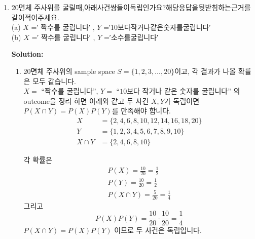 \documentclass{article}
\newenvironment{solution}
{
    \par\medskip
    \noindent\textbf{Solution:}
    \begin{adjustwidth}{1em}{0em}
}
{
    \end{adjustwidth}
    \medskip
}
\begin{document}
\begin{enumerate}[label=\textbf{\arabic*.}, leftmargin=*]
\begin{solution}
\begin{enumerate}[label=(\alph*), leftmargin=2em, itemsep=1em]
        분자 $P(S_1\cap F_2)$는 전체확률법칙을 이용해서 구합니다.  
        $$  
        P(S_1\cap F_2)=P(S_1\cap F_2\mid H+)P(H+)+P(S_1\cap F_2\mid H-)P(H-)  
        $$  
        $H+$ 참가자는 항상 잔류하므로 두 번째 에피소드에서 탈락할 확률이 $0$이고, $H-$ 참가자는 첫 번째 에피소드에서 잔류할 확률이 1/3, 두 번째 에피소드에서 탈락할 확률이 2/3이기 때문에 값을 넣어 계산하면:  
        \begin{align*}
            P(S_1\cap F_2)
            &=0\cdot\frac14+\left(\frac13\cdot\frac23\right)\cdot\frac34\\
            &=\frac13\cdot\frac23\cdot\frac34=\frac16  
        \end{align*}
        따라서  
        $$  
        P(F_2\mid S_1)=\frac{\frac16}{\frac12}=\frac13  
        $$  
        따라서 첫 번째 에피소드에서 잔류에 성공한 참가자가 두 번째 에피소드에서 탈락할 확률은 $\frac13$ 입니다.
        
        \end{enumerate}
    
    \end{solution}
\newpage

\item 20면체 주사위를 굴릴때,아래사건쌍들이독립인가요?해당응답을뒷받침하는근거를같이적어주세요.\\
(a) $X$ =′ 짝수를 굴립니다′ , $Y$ =′10보다작거나같은숫자를굴립니다′\\
(b) $X$ =′ 짝수를 굴립니다′ , $Y$ =′소수를굴립니다′

    \begin{solution}
        \begin{enumerate}[label=(\alph*), leftmargin=2em, itemsep=1em]
            
            \item20면체 주사위의 sample space $S=\{1,2,3,\dots,20\}$이고, 각 결과가 나올 확률은 모두 같습니다.  \\
            $X=$ “짝수를 굴립니다”, $Y=$ “$10$보다 작거나 같은 숫자를 굴립니다” 의 outcome을 정리 하면 아래와 같고 두 사건 $X,Y$가 독립이면$P(X\cap Y)=P(X)P(Y)$를 만족해야 합니다.
            \begin{align*}
                X&=\{2,4,6,8,10,12,14,16,18,20\}\\  
                Y&=\{1,2,3,4,5,6,7,8,9,10\} \\
                X\cap Y&=\{2,4,6,8,10\} 
            \end{align*}
            
            각 확률은  
            \begin{align*}
                P(X)=\frac{10}{20}=\frac12\\  
                P(Y)=\frac{10}{20}=\frac12\\  
                P(X\cap Y)=\frac{5}{20}=\frac14  
            \end{align*} 
            그리고  
            $$  
            P(X)P(Y)=\frac{10}{20}\cdot\frac{10}{20}=\frac14  
            $$  
            $P(X\cap Y)=P(X)P(Y)$ 이므로 두 사건은 독립입니다. 
            

\end{enumerate}
\end{solution}
\end{enumerate}
\end{document}
